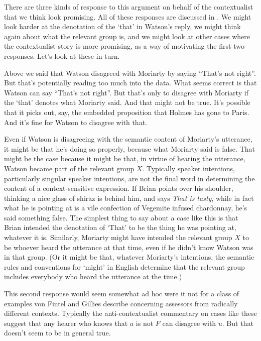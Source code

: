 There are three kinds of response to this argument on behalf of the contextualist that we think look promising. All of these responses are discussed in \citet{vonFintel2008}. We might look harder at the denotation of the `that' in Watson's reply, we might think again about what the relevant group is, and we might look at other cases where the contextualist story is more promising, as a way of motivating the first two responses. Let's look at these in turn.

Above we said that Watson disagreed with Moriarty by saying ``That's not right''. But that's potentially reading too much into the data. What seems correct is that Watson can say ``That's not right''. But that's only to disagree with Moriarty if the `that' denotes what Moriarty said. And that might not be true. It's possible that it picks out, say, the embedded proposition that Holmes has gone to Paris. And it's fine for Watson to disagree with that.

Even if Watson is disagreeing with the semantic content of Moriarty's utterance, it might be that he's doing so properly, because what Moriarty said is false. That might be the case because it might be that, in virtue of hearing the utterance, Watson became part of the relevant group $X$. Typically speaker intentions, particularly singular speaker intentions, are not the final word in determining the content of a context-sensitive expression. If Brian points over his shoulder, thinking a nice glass of shiraz is behind him, and says \textit{That is tasty}, while in fact what he is pointing at is a vile confection of Vegemite infused chardonnay, he's said something false. The simplest thing to say about a case like this is that Brian intended the denotation of `That' to be the thing he was pointing at, whatever it is. Similarly, Moriarty might have intended the relevant group $X$ to be whoever heard the utterance at that time, even if he didn't know Watson was in that group.  (Or it might be that, whatever Moriarty's intentions, the semantic rules and conventions for `might' in English determine that the relevant group includes everybody who heard the utterance at the time.)

This second response would seem somewhat ad hoc were it not for a class of examples von Fintel and Gillies describe concerning assessors from radically different contexts. Typically the anti-contextualist commentary on cases like these suggest that any hearer who knows that $a$ is not $F$ can disagree with $u$. But that doesn't seem to be in general true.

